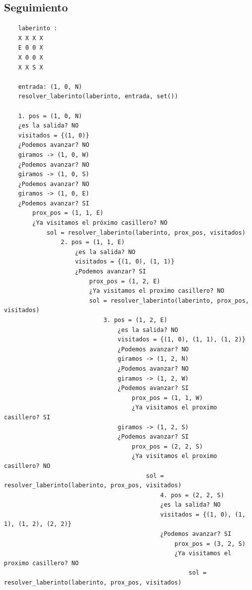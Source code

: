 \subsection{Seguimiento}
\begin{verbatim}
    laberinto :
    X X X X
    E 0 0 X
    X 0 0 X
    X X S X

    entrada: (1, 0, N)
    resolver_laberinto(laberinto, entrada, set())

    1. pos = (1, 0, N)
    ¿es la salida? NO
    visitados = {(1, 0)}
    ¿Podemos avanzar? NO
    giramos -> (1, 0, W)
    ¿Podemos avanzar? NO
    giramos -> (1, 0, S)
    ¿Podemos avanzar? NO
    giramos -> (1, 0, E)
    ¿Podemos avanzar? SI 
        prox_pos = (1, 1, E)
        ¿Ya visitamos el próximo casillero? NO
            sol = resolver_laberinto(laberinto, prox_pos, visitados)
                2. pos = (1, 1, E)
                    ¿es la salida? NO
                    visitados = {(1, 0), (1, 1)}
                    ¿Podemos avanzar? SI 
                        prox_pos = (1, 2, E)
                        ¿Ya visitamos el proximo casillero? NO
                        sol = resolver_laberinto(laberinto, prox_pos, visitados)
                            3. pos = (1, 2, E)
                                ¿es la salida? NO
                                visitados = {(1, 0), (1, 1), (1, 2)}
                                ¿Podemos avanzar? NO
                                giramos -> (1, 2, N)
                                ¿Podemos avanzar? NO
                                giramos -> (1, 2, W)
                                ¿Podemos avanzar? SI
                                    prox_pos = (1, 1, W)
                                    ¿Ya visitamos el proximo casillero? SI
                                giramos -> (1, 2, S)
                                ¿Podemos avanzar? SI
                                    prox_pos = (2, 2, S)
                                    ¿Ya visitamos el proximo casillero? NO
                                        sol = resolver_laberinto(laberinto, prox_pos, visitados)
                                            4. pos = (2, 2, S)
                                            ¿es la salida? NO
                                            visitados = {(1, 0), (1, 1), (1, 2), (2, 2)}
                                            ¿Podemos avanzar? SI
                                                prox_pos = (3, 2, S)
                                                ¿Ya visitamos el proximo casillero? NO
                                                    sol = resolver_laberinto(laberinto, prox_pos, visitados)

\end{verbatim}
